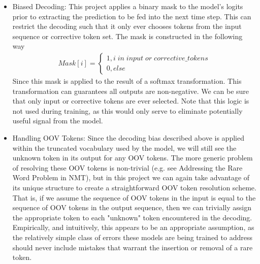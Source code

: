\begin{itemize}
    \item Biased Decoding: This project applies a binary mask to the model's logits prior to extracting the prediction to be fed into the next time step. This can restrict the decoding such that it only ever chooses tokens from the input sequence or corrective token set. The mask is constructed in the following way
    \begin{align}
    Mask[i]=
    \begin{cases}
        1, i \; in \; input\; or\; corrective\_tokens\\
        0, else
    \end{cases}
    \end{align}
    Since this mask is applied to the result of a softmax transformation. This transformation can guarantees all outputs are non-negative. We can be sure that only input or corrective tokens are ever selected. Note that this logic is not used during training, as this would only serve to eliminate potentially useful signal from the model.
    \item Handling OOV Tokens: Since the decoding bias described above is applied within the truncated vocabulary used by the model, we will still see the unknown token in its output for any OOV tokens. The more generic problem of resolving these OOV tokens is non-trivial (e.g. see Addressing the Rare Word Problem in NMT), but in this project we can again take advantage of its unique structure to create a straightforward OOV token resolution scheme. That is, if we assume the sequence of OOV tokens in the input is equal to the sequence of OOV tokens in the output sequence, then we can trivially assign the appropriate token to each "unknown" token encountered in the decoding. Empirically, and intuitively, this appears to be an appropriate assumption, as the relatively simple class of errors these models are being trained to address should never include mistakes that warrant the insertion or removal of a rare token.
\end{itemize}

